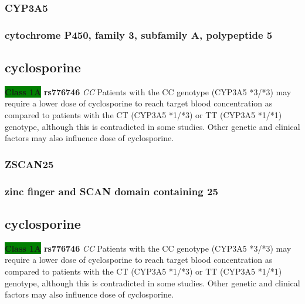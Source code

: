 \documentclass{book}
\begin{document}
\subsubsection{ CYP3A5 }
\subsubsection{ cytochrome P450, family 3, subfamily A, polypeptide 5 }

\subsection{ cyclosporine }


\begin{center}



\textbf{\colorbox{green} {Class 1A}} \textbf{ rs776746 } \textit{ CC }
Patients with the CC genotype (CYP3A5 *3/*3) may require a lower dose of cyclosporine to reach target blood concentration as compared to patients with the CT (CYP3A5 *1/*3) or TT (CYP3A5 *1/*1) genotype, although this is contradicted in some studies. Other genetic and clinical factors may also influence dose of cyclosporine.

\end{center}






\subsubsection{ ZSCAN25 }
\subsubsection{ zinc finger and SCAN domain containing 25 }

\subsection{ cyclosporine }


\begin{center}



\textbf{\colorbox{green} {Class 1A}} \textbf{ rs776746 } \textit{ CC }
Patients with the CC genotype (CYP3A5 *3/*3) may require a lower dose of cyclosporine to reach target blood concentration as compared to patients with the CT (CYP3A5 *1/*3) or TT (CYP3A5 *1/*1) genotype, although this is contradicted in some studies. Other genetic and clinical factors may also influence dose of cyclosporine.

\end{center}
\end{document}
